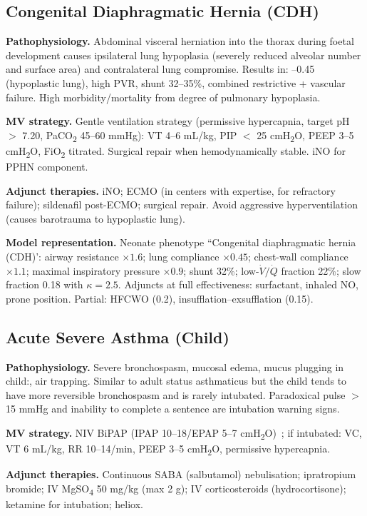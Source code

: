 \subsection{Congenital Diaphragmatic Hernia (CDH)}
\textbf{Pathophysiology.} Abdominal visceral herniation into the thorax during foetal development causes ipsilateral lung hypoplasia (severely reduced alveolar number and surface area) and contralateral lung compromise. Results in: --0.45 (hypoplastic lung), high PVR, shunt 32--35\%, combined restrictive + vascular failure. High morbidity/mortality from degree of pulmonary hypoplasia.

\textbf{MV strategy.} Gentle ventilation strategy (permissive hypercapnia, target pH $>$ 7.20, PaCO\textsubscript{2} 45--60 mmHg): VT 4--6 mL/kg, PIP $<$ 25 cmH\textsubscript{2}O, PEEP 3--5 cmH\textsubscript{2}O, FiO\textsubscript{2} titrated. Surgical repair when hemodynamically stable. iNO for PPHN component.

\textbf{Adjunct therapies.} iNO; ECMO (in centers with expertise, for refractory failure); sildenafil post-ECMO; surgical repair. Avoid aggressive hyperventilation (causes barotrauma to hypoplastic lung).

\textbf{Model representation.} Neonate phenotype ``Congenital diaphragmatic hernia (CDH)': airway resistance $\times1.6$; lung compliance $\times0.45$; chest-wall compliance $\times1.1$; maximal inspiratory pressure $\times0.9$; shunt 32\%; low-$\dot V/\dot Q$ fraction 22\%; slow fraction 0.18 with $\kappa=2.5$. Adjuncts at full effectiveness: surfactant, inhaled NO, prone position. Partial: HFCWO (0.2), insufflation--exsufflation (0.15).

\subsection{Acute Severe Asthma (Child)}
\textbf{Pathophysiology.} Severe bronchospasm, mucosal edema, mucus plugging in child:, air trapping. Similar to adult status asthmaticus but the child tends to have more reversible bronchospasm and is rarely intubated. Paradoxical pulse $>$ 15 mmHg and inability to complete a sentence are intubation warning signs.

\textbf{MV strategy.} NIV BiPAP (IPAP 10--18/EPAP 5--7 cmH\textsubscript{2}O)~\citep{soroksky2003}; if intubated: VC, VT 6 mL/kg, RR 10--14/min, PEEP 3--5 cmH\textsubscript{2}O, permissive hypercapnia.

\textbf{Adjunct therapies.} Continuous SABA (salbutamol) nebulisation; ipratropium bromide; IV MgSO\textsubscript{4} 50 mg/kg (max 2 g); IV corticosteroids (hydrocortisone); ketamine for intubation; heliox.

